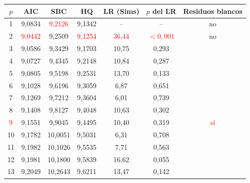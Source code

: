 \begin{tabular}{ccccccc}
\toprule
$p$ & AIC & SBC & HQ & LR (Sims) & $p$ del LR & Residuos blancos
\\ \midrule
1 & 9{,}0834 & \textcolor{red}{9{,}2126} & 9{,}1342 & -- & -- & no \\
2 & \textcolor{red}{9{,}0442} & 9{,}2509 & \textcolor{red}{9{,}1254} & \textcolor{red}{36{,}44} & \textcolor{red}{\ensuremath{<0{,}001}} & no \\
3 & 9{,}0586 & 9{,}3429 & 9{,}1703 & 10{,}75 & 0{,}293 &  \\
4 & 9{,}0727 & 9{,}4345 & 9{,}2148 & 10{,}84 & 0{,}287 &  \\
5 & 9{,}0805 & 9{,}5198 & 9{,}2531 & 13{,}70 & 0{,}133 &  \\
6 & 9{,}1028 & 9{,}6196 & 9{,}3059 & 6{,}87 & 0{,}651 &  \\
7 & 9{,}1269 & 9{,}7212 & 9{,}3604 & 6{,}01 & 0{,}739 &  \\
8 & 9{,}1408 & 9{,}8127 & 9{,}4048 & 10{,}63 & 0{,}302 &  \\
\textcolor{red}{9} & 9{,}1551 & 9{,}9045 & 9{,}4495 & 10{,}40 & 0{,}319 & \textcolor{red}{s\'i} \\
10 & 9{,}1782 & 10{,}0051 & 9{,}5031 & 6{,}31 & 0{,}708 &  \\
11 & 9{,}1982 & 10{,}1026 & 9{,}5535 & 7{,}71 & 0{,}563 &  \\
12 & 9{,}1981 & 10{,}1800 & 9{,}5839 & 16{,}62 & 0{,}055 &  \\
13 & 9{,}2049 & 10{,}2643 & 9{,}6211 & 13{,}47 & 0{,}142 &  \\
\bottomrule
\end{tabular}
